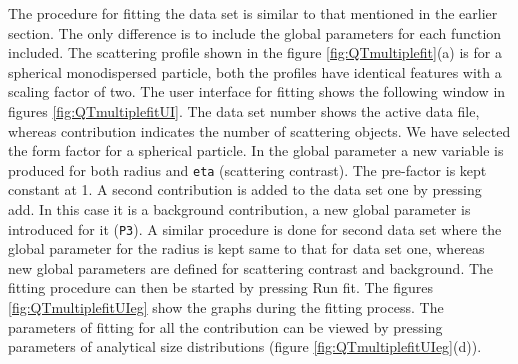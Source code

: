 The procedure for fitting the data set is similar to that mentioned
in the earlier section. The only difference is to include the global
parameters for each function included. The scattering profile shown
in the figure \ref{fig:QTmultiplefit}(a) is for a spherical
monodispersed particle, both
the profiles have identical features with a scaling factor of two.
The user interface for fitting shows the following window in figures
\ref{fig:QTmultiplefitUI}. The data set number shows the active data file, whereas
contribution indicates the number of scattering objects. We have
selected the form factor for a spherical particle. In the global
parameter a new variable is produced for both radius and \texttt{eta}
(scattering contrast). The pre-factor is kept constant at 1. A
second contribution is added to the data set one by pressing add. In
this case it is a background contribution, a new global parameter is
introduced for it (\texttt{P3}). A similar procedure is done for second data
set where the global parameter for the radius is kept same to that
for data set one, whereas new global parameters are defined for
scattering contrast and background. The fitting procedure can then
be started by pressing Run fit. The figures \ref{fig:QTmultiplefitUIeg}
show the graphs during the fitting process. The parameters of fitting for all the
contribution can be viewed by pressing parameters of analytical size
distributions (figure \ref{fig:QTmultiplefitUIeg}(d)).

